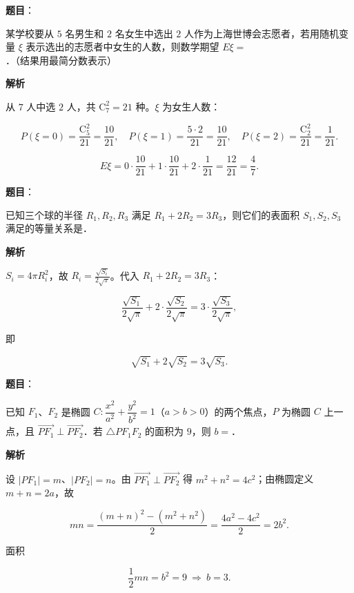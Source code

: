 \begin{answer}

\textbf{题目}：

某学校要从 $5$ 名男生和 $2$ 名女生中选出 $2$ 人作为上海世博会志愿者，若用随机变量 $\xi$ 表示选出的志愿者中女生的人数，则数学期望 $E\xi=$\gkblank{}．（结果用最简分数表示）

\textbf{解析}

从 $7$ 人中选 $2$ 人，共 $\mathrm C_7^2=21$ 种。$\xi$ 为女生人数：

\nopagebreak[4]
\[P(\xi=0)=\frac{\mathrm C_5^2}{21}=\frac{10}{21},\quad
P(\xi=1)=\frac{5\cdot2}{21}=\frac{10}{21},\quad
P(\xi=2)=\frac{\mathrm C_2^2}{21}=\frac1{21}.\]

\nopagebreak[4]
\[E\xi=0\cdot\frac{10}{21}+1\cdot\frac{10}{21}+2\cdot\frac1{21}=\frac{12}{21}=\frac47 .\]


\end{answer}
\begin{answer}

\textbf{题目}：

已知三个球的半径 $R_1,R_2,R_3$ 满足 $R_1+2R_2=3R_3$，则它们的表面积 $S_1,S_2,S_3$ 满足的等量关系是\gkblank{}．

\textbf{解析}

$S_i=4\pi R_i^2$，故 $R_i=\frac{\sqrt{S_i}}{2\sqrt\pi}$。代入 $R_1+2R_2=3R_3$：

\nopagebreak[4]
\[\frac{\sqrt{S_1}}{2\sqrt\pi}+2\cdot\frac{\sqrt{S_2}}{2\sqrt\pi}=3\cdot\frac{\sqrt{S_3}}{2\sqrt\pi},\]

即

\nopagebreak[4]
\[\sqrt{S_1}+2\sqrt{S_2}=3\sqrt{S_3}.\]


\end{answer}
\begin{answer}

\textbf{题目}：

已知 $F_1$、$F_2$ 是椭圆 $C:\dfrac{x^2}{a^2}+\dfrac{y^2}{b^2}=1$（$a>b>0$）的两个焦点，$P$ 为椭圆 $C$ 上一点，且 $\overrightarrow{PF_1}\perp\overrightarrow{PF_2}$．若 $\triangle PF_1F_2$ 的面积为 $9$，则 $b=$\gkblank{}．

\textbf{解析}

设 $|PF_1|=m$、$|PF_2|=n$。由 $\overrightarrow{PF_1}\perp\overrightarrow{PF_2}$ 得 $m^2+n^2=4c^2$；由椭圆定义 $m+n=2a$，故

\nopagebreak[4]
\[mn=\frac{(m+n)^2-(m^2+n^2)}{2}=\frac{4a^2-4c^2}{2}=2b^2 .\]

面积

\nopagebreak[4]
\[\frac12mn=b^2=9\ \Longrightarrow\ b=3 .\]


\end{answer}
